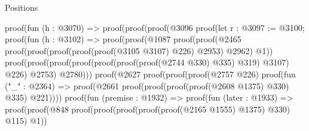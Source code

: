 \begin{lexlean}{Positions}
\begin{coremodule}
                            proof(fun (h : @3070) =>
                              proof(proof(proof(@3096
                                      proof(let r : @3097 := @3100;
                                        proof(fun (h : @3102) =>
                                          proof(proof(@1087
                                                proof(proof(@2465
                                                      proof(proof(proof(proof(proof(@3105 @3107)
                                                                @226)
                                                              @2953)
                                                            @2962)
                                                          @1))
                                                    proof(proof(proof(proof(proof(proof(proof(@2744
                                                                    @330)
                                                                  @335)
                                                                @319)
                                                              @3107)
                                                            @226)
                                                          @2753)
                                                        @2780)))
                                              proof(@2627
                                                  proof(proof(proof(@2757 @226)
                                                        proof(fun ("_" : @2364) =>
                                                          proof(@2661
                                                              proof(proof(proof(proof(@2608 @1375)
                                                                      @330)
                                                                    @335)
                                                                  @221))))
                                                      proof(fun (premise : @1932) =>
                                                        proof(fun (later : @1933) =>
                                                          proof(proof(@848
                                                                proof(proof(proof(proof(proof(@2165
                                                                            @1555)
                                                                          @1375)
                                                                        @330)
                                                                      @115)
                                                                    @1))

\end{coremodule}
\end{lexlean}
